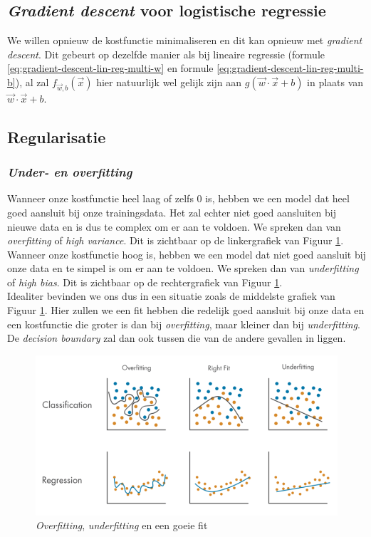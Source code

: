 \subsection{\textit{Gradient descent} voor logistische regressie}

We willen opnieuw de kostfunctie minimaliseren en dit kan opnieuw met \textit{gradient descent}. Dit gebeurt op dezelfde manier als bij lineaire regressie (formule \ref{eq:gradient-descent-lin-reg-multi-w} en formule \ref{eq:gradient-descent-lin-reg-multi-b}), al zal $f_{\vec{w},b}(\vec{x})$ hier natuurlijk wel gelijk zijn aan $g(\vec{w} \cdot \vec{x} + b)$ in plaats van $\vec{w} \cdot \vec{x} + b$.
\newpage
\subsection{Regularisatie}
\subsubsection{\textit{Under- en overfitting}}
Wanneer onze kostfunctie heel laag of zelfs 0 is, hebben we een model dat heel goed aansluit bij onze trainingsdata. Het zal echter niet goed aansluiten bij nieuwe data en is dus te complex om er aan te voldoen. We spreken dan van \textit{overfitting} of \textit{high variance}. Dit is zichtbaar op de linkergrafiek van Figuur \ref{fig:overfitting-underfitting}. \\
\newline
Wanneer onze kostfunctie hoog is, hebben we een model dat niet goed aansluit bij onze data en te simpel is om er aan te voldoen. We spreken dan van \textit{underfitting} of \textit{high bias}. Dit is zichtbaar op de rechtergrafiek van Figuur \ref{fig:overfitting-underfitting}. \\
\newline
Idealiter bevinden we ons dus in een situatie zoals de middelste grafiek van Figuur \ref{fig:overfitting-underfitting}. Hier zullen we een fit hebben die redelijk goed aansluit bij onze data en een kostfunctie die groter is dan bij \textit{overfitting}, maar kleiner dan bij \textit{underfitting}. De \textit{decision boundary} zal dan ook tussen die van de andere gevallen in liggen.

\begin{figure}[h]
	\centering
	\includegraphics[width=\textwidth]{images/11-overfitting-underfitting.png}
	\caption{\textit{Overfitting}, \textit{underfitting} en een goeie fit}
	\label{fig:overfitting-underfitting}
\end{figure}

